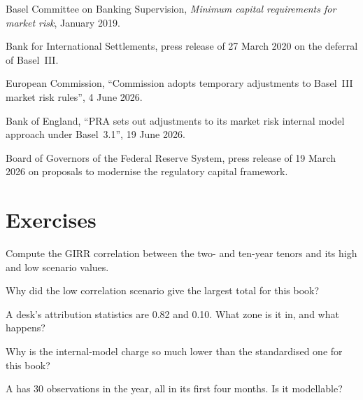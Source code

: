 \begin{omsources}
\item Basel Committee on Banking Supervision, \emph{Minimum capital requirements for market
risk}, January 2019.
\item Bank for International Settlements, press release of 27 March 2020 on the deferral of Basel~III.
\item European Commission, ``Commission adopts temporary adjustments to Basel~III market risk
rules'', 4 June 2026.
\item Bank of England, ``PRA sets out adjustments to its market risk internal model approach
under Basel~3.1'', 19 June 2026.
\item Board of Governors of the Federal Reserve System, press release of 19 March 2026 on
proposals to modernise the regulatory capital framework.
\end{omsources}

\section{Exercises}

\begin{exercise}[$\star$]\label{exo:rc:regulatory-capital-for-trading-books:1}
Compute the GIRR correlation between the two- and ten-year tenors and its high and low scenario
values.
\end{exercise}

\begin{exercise}[$\star$]\label{exo:rc:regulatory-capital-for-trading-books:2}
Why did the low correlation scenario give the largest total for this book?
\end{exercise}

\begin{exercise}[$\star$]\label{exo:rc:regulatory-capital-for-trading-books:3}
A desk's attribution statistics are 0.82 and 0.10. What zone is it in, and what happens?
\end{exercise}

\begin{exercise}[$\star\star$]\label{exo:rc:regulatory-capital-for-trading-books:4}
Why is the internal-model charge so much lower than the standardised one for this book?
\end{exercise}

\begin{exercise}[$\star\star$]\label{exo:rc:regulatory-capital-for-trading-books:5}
A  has 30 observations in the year, all in its first four months. Is it modellable?
\end{exercise}

